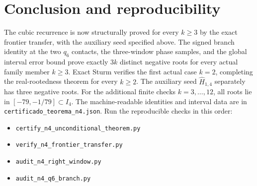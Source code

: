 \documentclass[11pt]{article}
\begin{document}
\section{Conclusion and reproducibility}
The cubic recurrence is now structurally proved for every $k\geq3$ by
the exact frontier transfer, with the auxiliary seed specified above.
The signed branch identity at the two $q_6$ contacts, the three-window
phase samples, and the global interval error bound prove exactly $3k$
distinct negative roots for every actual family member $k\geq3$.
Exact Sturm verifies the first actual case $k=2$, completing the
real-rootedness theorem for every $k\geq2$. The auxiliary seed
$\widehat H_{1,4}$ separately has three negative roots. For the
additional finite checks $k=3,\ldots,12$, all roots lie in
$[-79,-1/79]\subset I_4$.
The machine-readable identities and interval data are in
\texttt{certificado\_teorema\_n4.json}. Run the reproducible checks in
this order:
\begin{itemize}
\item \texttt{certify\_n4\_unconditional\_theorem.py}
\item \texttt{verify\_n4\_frontier\_transfer.py}
\item \texttt{audit\_n4\_right\_window.py}
\item \texttt{audit\_n4\_q6\_branch.py}
\end{itemize}
\end{document}
